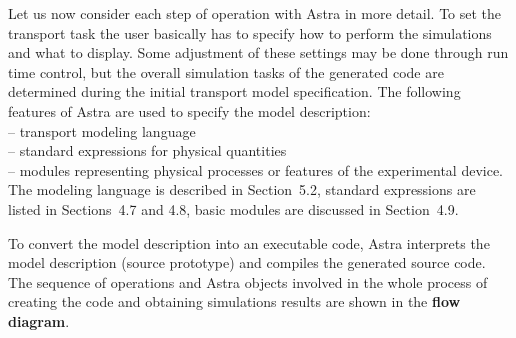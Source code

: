%
%

Let us now consider each step of operation with Astra in more detail.
To set the transport task the user basically has to specify how to
perform the simulations and what to display.
Some adjustment of these settings may be done through run time control,
but the overall simulation tasks of the generated code are determined
during the initial transport model specification.
The following features of Astra are used to specify the model description:
\\ \hspace*{5 mm} -- transport modeling language
\\ \hspace*{5 mm} -- standard expressions for physical quantities
\\ \hspace*{5 mm} -- modules representing physical processes or
features of the experimental device. \\
The modeling language is described in Section~5.2, standard expressions
are listed in Sections~4.7 and 4.8, basic modules are discussed in
Section~4.9. 

To convert the model description into an executable code, Astra
interprets the model description (source prototype) and compiles the
generated source code. 
The sequence of operations and Astra objects involved in the whole
process of creating the code and obtaining simulations results are shown
in the {\bf flow diagram}.\label{flow}

